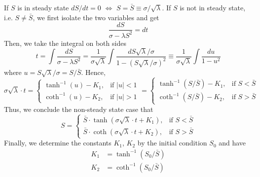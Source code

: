 \documentclass[a4paper, 11pt]{article}
\theoremstyle{plain} %
\begin{document}
If $S$ is in steady state $dS/dt = 0$ $\Leftrightarrow$ $S = \bar{S} \equiv \sigma/\sqrt{\lambda}$. 
If $S$ is not in steady state, i.e. $S\not=\bar{S}$, we first isolate the two variables and get 
\begin{equation*}
	\frac{dS}{\sigma-\lambda S^2} = dt
\end{equation*}
Then, we take the integral on both sides
\begin{equation*}
    t = \int \frac{dS}{\sigma-\lambda S^2} = \frac{1}{\sigma\sqrt{\lambda}} \int \frac{dS\sqrt{\lambda}/\sigma}{1 - (S\sqrt{\lambda}/\sigma)^2} \equiv \frac{1}{\sigma\sqrt{\lambda}}\int \frac{du}{1-u^2} 
\end{equation*}
where $u = S\sqrt{\lambda}/\sigma = S/\bar{S}$. Hence, 
\begin{equation*}
    \sigma\sqrt{\lambda}\cdot t = \begin{cases}
        \tanh^{-1}(u)-K_1, & \text{if } |u|<1\\
        \coth^{-1}(u)-K_2, & \text{if } |u|>1
    \end{cases} = \begin{cases}
        \tanh^{-1}(S/\bar{S})-K_1, & \text{if } S<\bar{S}\\
        \coth^{-1}(S/\bar{S})-K_2, & \text{if } S>\bar{S} 
\end{cases}
\end{equation*}
Thus, we conclude the non-steady state case that 
\begin{equation*}
	S = \begin{cases}
		\bar{S}\cdot\tanh(\sigma\sqrt{\lambda}\cdot t + K_1), & \text{if } S<\bar{S}\\
		\bar{S}\cdot\coth(\sigma\sqrt{\lambda}\cdot t + K_2), & \text{if } S>\bar{S} 
	\end{cases}
\end{equation*}
Finally, we determine the constants $K_1$, $K_2$ by the initial condition $S_0$ and have 
\begin{align*}
	K_1 &= \tanh^{-1}(S_0/\bar{S})\\
	K_2 &= \coth^{-1}(S_0/\bar{S})
\end{align*}
\end{document}
